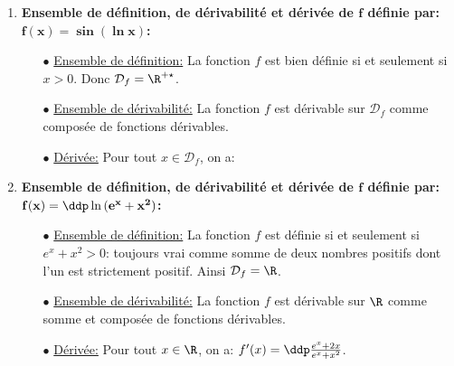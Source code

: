 \begin{correction}
\begin{enumerate}
\begin{itemize}
 \end{itemize}
\item  \textbf{Ensemble de d\'efinition, de d\'erivabilit\'e et d\'eriv\'ee de $\mathbf{f}$ d\'efinie par: $\mathbf{f(x)=\sin{(\ln{x})}}$:}
\begin{itemize}
\item[$\bullet$] \underline{Ensemble de d\'efinition:} La fonction $f$ est bien d\'efinie si et seulement si $x>0$. Donc $\mathcal{D}_f=\R^{+\star}$.
\item[$\bullet$] \underline{Ensemble de d\'erivabilit\'e:} La fonction $f$ est d\'erivable sur $\mathcal{D}_f$ comme compos\'ee de fonctions d\'erivables.
\item[$\bullet$] \underline{D\'eriv\'ee:} Pour tout $x\in\mathcal{D}_f$, on a:  
 \end{itemize}
\item  \textbf{Ensemble de d\'efinition, de d\'erivabilit\'e et d\'eriv\'ee de $\mathbf{f}$ d\'efinie par: $\mathbf{f(x)=\ddp \ln{(e^x+x^2)}}$:}
\begin{itemize}
\item[$\bullet$] \underline{Ensemble de d\'efinition:} La fonction $f$ est d\'efinie si et seulement si $e^x+x^2>0$: toujours vrai comme somme de deux nombres positifs dont l'un  est strictement positif. Ainsi $\mathcal{D}_{f}=\R$. 
\item[$\bullet$] \underline{Ensemble de d\'erivabilit\'e:} La fonction $f$ est d\'erivable sur $\R$ comme somme et compos\'ee de fonctions d\'erivables.
\item[$\bullet$] \underline{D\'eriv\'ee:}  Pour tout $x\in\R$, on a: $f^{\prime}(x)=\ddp\frac{e^x+2x}{e^x+x^2}$.
 \end{itemize}


\end{enumerate}
\end{correction}
